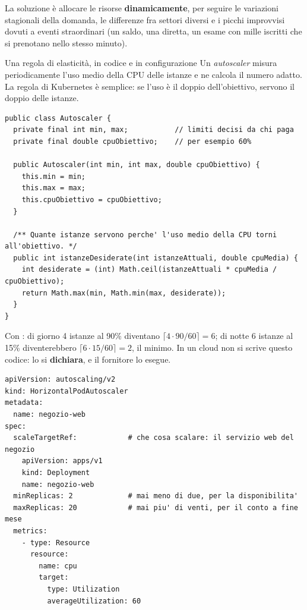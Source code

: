 La soluzione è allocare le risorse \textbf{dinamicamente}, per seguire le variazioni stagionali della domanda, le
differenze fra settori diversi e i picchi improvvisi dovuti a eventi straordinari (un saldo, una diretta, un esame con
mille iscritti che si prenotano nello stesso minuto).

\begin{esempio}{Una regola di elasticità, in codice e in configurazione}
Un \textit{autoscaler} misura periodicamente l'uso medio della CPU delle istanze e ne calcola il numero adatto. La
regola di Kubernetes è semplice: se l'uso è il doppio dell'obiettivo, servono il doppio delle istanze.
\begin{lstlisting}[style=java, name=Autoscaler.java]
public class Autoscaler {
  private final int min, max;           // limiti decisi da chi paga
  private final double cpuObiettivo;    // per esempio 60%

  public Autoscaler(int min, int max, double cpuObiettivo) {
    this.min = min;
    this.max = max;
    this.cpuObiettivo = cpuObiettivo;
  }

  /** Quante istanze servono perche' l'uso medio della CPU torni all'obiettivo. */
  public int istanzeDesiderate(int istanzeAttuali, double cpuMedia) {
    int desiderate = (int) Math.ceil(istanzeAttuali * cpuMedia / cpuObiettivo);
    return Math.max(min, Math.min(max, desiderate));
  }
}
\end{lstlisting}
Con : di giorno 4 istanze al 90\% diventano $\lceil 4 \cdot 90/60 \rceil = 6$; di notte
6 istanze al 15\% diventerebbero $\lceil 6 \cdot 15/60 \rceil = 2$, il minimo. In un cloud non si scrive questo codice: lo
si \textbf{dichiara}, e il fornitore lo esegue.
\begin{lstlisting}[style=yaml, name=autoscaler.yaml]
apiVersion: autoscaling/v2
kind: HorizontalPodAutoscaler
metadata:
  name: negozio-web
spec:
  scaleTargetRef:            # che cosa scalare: il servizio web del negozio
    apiVersion: apps/v1
    kind: Deployment
    name: negozio-web
  minReplicas: 2             # mai meno di due, per la disponibilita'
  maxReplicas: 20            # mai piu' di venti, per il conto a fine mese
  metrics:
    - type: Resource
      resource:
        name: cpu
        target:
          type: Utilization
          averageUtilization: 60
\end{lstlisting}
\end{esempio}

